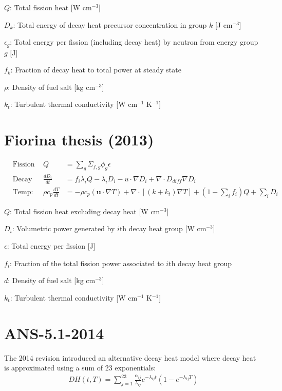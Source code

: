 \documentclass[letterpaper,11pt]{article}
\begin{document}
$Q$: Total fission heat [W cm$^{-3}$]

$D_k$: Total energy of decay heat precursor concentration in group $k$ [J cm$^{-3}$]

$\epsilon_g$: Total energy per fission (including decay heat) by neutron from energy group $g$ [J]

$f_k$: Fraction of decay heat to total power at steady state

$\rho$: Density of fuel salt [kg cm$^{-3}$]

$k_t$: Turbulent thermal conductivity [W cm$^{-1}$ K$^{-1}$]

\pagebreak

\section*{Fiorina thesis (2013)}
%
\begin{align}
&\text{Fission power density:} & Q &= \sum_g \Sigma_{f,g} \phi_g \epsilon & \\
&\text{Decay heat density:} & \frac{d D_i}{dt} &= f_i \lambda_i Q - \lambda_i D_i
- u \cdot\nabla D_i + \nabla \cdot D_{diff} \nabla D_i & \label{eq:7} \\
&\text{Temp:} & \rho c_p \frac{dT}{dt} &= - \rho c_p (\boldsymbol{u} \cdot \nabla T) + \nabla \cdot [(k + k_t) \nabla T] + (1 - \sum_i f_i) Q + \sum_i D_i &
\end{align}

$Q$: Total fission heat excluding decay heat [W cm$^{-3}$]

$D_i$: Volumetric power generated by $i$th decay heat group [W cm$^{-3}$]

$\epsilon$: Total energy per fission [J]

$f_i$: Fraction of the total fission power associated to $i$th decay heat group

$d$: Density of fuel salt [kg cm$^{-3}$]

$k_t$: Turbulent thermal conductivity [W cm$^{-1}$ K$^{-1}$]

\section*{ANS-5.1-2014}

The 2014 revision introduced an alternative decay heat model where decay heat
is approximated using a sum of 23 exponentials:
%
\begin{align}
DH(t,T) = \sum^{23}_{j=1} \frac{\alpha_{ij}}{\lambda_{ij}} e^{-\lambda_{ij}
t} (1 - e^{-\lambda_{ij} T})
\end{align}
\end{document}
